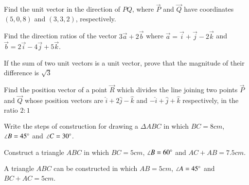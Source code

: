 \documentclass[journal]{IEEEtran}
\begin{document}

\onecolumn

Find the unit vector in the direction of $PQ$, where $\vec P$ and
$\vec Q$ have coordinates $(5, 0, 8)$ and $(3, 3, 2)$, respectively.

Find the direction ratios of the vector $3\vec{a} + 2\vec{b}$ where
$\vec{a} = \vec{i} + \vec{j} - 2\vec{k}$ and $\vec{b} = 2\vec{i} - 4\vec{j} + 5\vec{k}$.

If the sum of two unit vectors is a unit vector, prove that the magnitude of their difference
is $\sqrt 3$

Find the position vector of a point $\vec R$ which divides the line joining two points $\vec P$ and $\vec Q$ whose position vectors are $\hat{i} + 2 \hat{j} - \hat{k}$ and $-\hat{i} + \hat{j} + \hat{k}$ respectively, in the ratio $2:1$

Write the steps of construction for drawing a $\Delta ABC$ in which $BC = 8cm$,
$\angle B = 45 \degree$ and $\angle C = 30 \degree$.

Construct a triangle $ABC$ in which $BC = 5cm$, $\angle B = 60 \degree$ and $AC + AB = 7.5cm$.

A triangle $ABC$ can be constructed in which $AB = 5cm$, $\angle A = 45 \degree$ and $BC + AC = 5cm$.
\end{document}

